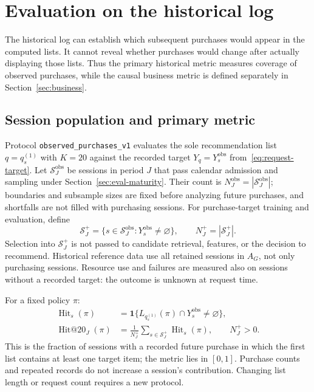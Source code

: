 \documentclass[12pt,a4paper]{article}
\newcommand{\code}[1]{{\ttfamily\small\nolinkurl{#1}}}
\newcommand{\ind}{\mathbf 1}
\theoremstyle{plainru}
\begin{document}
\section{Evaluation on the historical log}\label{sec:eval-offline}

The historical log can establish which subsequent purchases
would appear in the computed lists. It cannot reveal whether purchases would change
after actually displaying those lists. Thus the primary historical
metric measures coverage of observed purchases, while the causal business metric
is defined separately in Section~\ref{sec:business}.

\subsection{Session population and primary metric}
\label{sec:eval-observed}\label{sec:eval-schedule}

Protocol \code{observed_purchases_v1} evaluates the sole recommendation list
$q=q_s^{(1)}$ with $K=20$ against the recorded target
$Y_q=Y_s^{\mathrm{obs}}$ from~\eqref{eq:request-target}.
Let $\mathcal S_J^{\mathrm{obs}}$ be sessions in period $J$ that pass
calendar admission and sampling under Section~\ref{sec:eval-maturity}.
Their count is $N_J^{\mathrm{obs}}=|\mathcal S_J^{\mathrm{obs}}|$;
boundaries and subsample sizes are fixed before analyzing future purchases,
and shortfalls are not filled with purchasing sessions. For purchase-target
training and evaluation, define
\begin{equation}\label{eq:eval-observed-cohort}
 \mathcal S_J^+=\{s\in\mathcal S_J^{\mathrm{obs}}:
 Y_s^{\mathrm{obs}}\ne\varnothing\},\qquad N_J^+=|\mathcal S_J^+|.
\end{equation}
Selection into $\mathcal S_J^+$ is not passed to candidate retrieval, features, or the decision
to recommend. Historical reference data use all retained sessions
in $A_G$, not only purchasing sessions. Resource use and failures are measured
also on sessions without a recorded target: the outcome is unknown at request time.

For a fixed policy $\pi$:
\begin{align}
 \operatorname{Hit}_s(\pi)
 &=\ind\{L_{q_s^{(1)}}(\pi)\cap Y_s^{\mathrm{obs}}\ne\varnothing\},
 \label{eq:eval-session-hit}\\
 \operatorname{Hit@20}_J(\pi)
 &=\frac{1}{N_J^+}\sum_{s\in\mathcal S_J^+}\operatorname{Hit}_s(\pi),
 \qquad N_J^+>0.
 \label{eq:eval-observed-hit}
\end{align}
This is the fraction of sessions with a recorded future purchase in which
the first list contains at least one target item; the metric lies
in $[0,1]$. Purchase counts and repeated records do not increase a session's contribution.
Changing list length or request count requires a new protocol.
\end{document}
